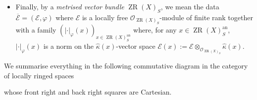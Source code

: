 \documentclass [11pt,reqno]{amsart}
\newcommand{\1}{\mathmybb{1}}
\def\cE{{\mathcal{E}}}
\def\cO{{\mathcal{O}}}
\def\an{\operatorname{an}}
\def\Spec{\operatorname{Spec}}
\def\ZR{\operatorname{ZR}}
\def\tilde{\widetilde}
\begin{document}
\begin{definition}
\begin{itemize}
	\item[(5)] Finally, by a \emph{metrised vector bundle} $\ZR(X)_{S}$, we mean the data $\overline{\cE}=(\cE,\varphi)$ where $\cE$ is a locally free $\cO_{\ZR(X)_{S}}$-module of finite rank together with a family $(|\cdot|_{\varphi}(x))_{x\in \ZR(X)^{\an}_{S}}$ where, for any $x\in \ZR(X)^{\an}_{S}$, $|\cdot|_{\varphi}(x)$ is a norm on the $\widehat{\kappa}(x)$-vector space $\cE(x):=\cE\otimes_{\cO_{\ZR(X)_{S}}}\widehat{\kappa}(x)$. 
\end{itemize}

We summarise everything in the following commutative diagram in the category of locally ringed spaces
\begin{center}
\end{center}
whose front right and back right squares are Cartesian. 
\end{definition}
\end{document}
